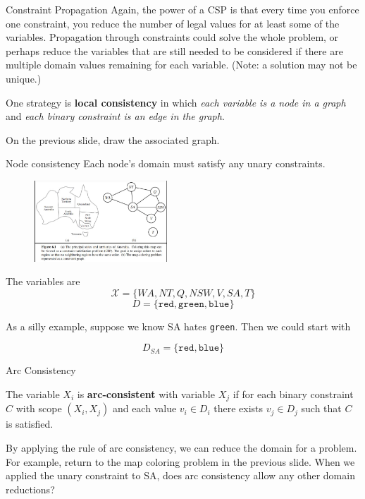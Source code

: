 \documentclass{beamer}
\begin{document}
\begin{frame}{Constraint Propagation}
    Again, the power of a CSP is that every time you enforce one constraint,
    you reduce the number of legal values for at least some of the variables.
    Propagation through constraints could solve the whole problem, or perhaps
    reduce the variables that are still needed to be considered if there are multiple domain values remaining for each variable. (Note: a solution may not be unique.)

    \vspace{.1in}

    One strategy is {\bf local consistency} in which {\em each variable is a node
    in a graph} and {\em each binary constraint is an edge in the graph}.

    \vspace{.1in}

    On the previous slide, draw the associated graph.    
\end{frame}

\begin{frame}{Node consistency}
    Each node's domain must satisfy any unary constraints.

    \small
    \begin{figure}
        \includegraphics[width=5cm]{images/map_coloring}
    \end{figure}
The variables are
    $$\mathcal{X} = \{WA, NT, Q, NSW, V, SA, T\}$$
$$ D = \{\texttt{red}, \texttt{green}, \texttt{blue}\}$$

As a silly example, suppose we know SA hates \texttt{green}. Then we 
could start with 

$$D_{SA} = \{\texttt{red}, \texttt{blue} \}$$

\end{frame}

\begin{frame}{Arc Consistency}

    The variable $X_i$ is {\bf arc-consistent} with variable $X_j$ if 
    for each binary constraint $C$ with scope $(X_i, X_j)$ and 
    each value $v_i \in D_i$ there exists $v_j \in D_j$ such that
    $C$ is satisfied.

    \vspace{.1in}

    By applying the rule of arc consistency, we can reduce the domain for a 
    problem. For example, return to the map coloring problem in the 
    previous slide. When we applied the unary constraint to SA, does 
    arc consistency allow any other domain reductions? 
    
\end{frame}
\end{document}
